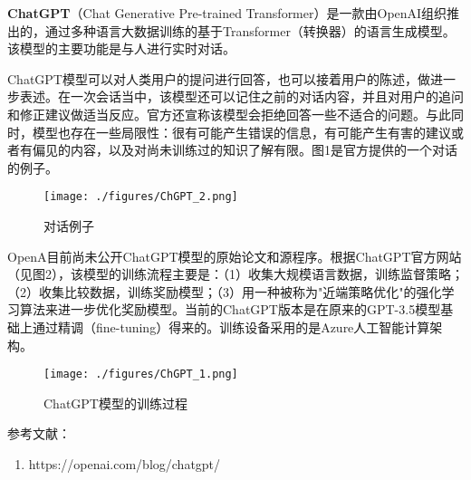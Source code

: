 
\textbf{ChatGPT}（Chat Generative Pre-trained Transformer）是一款由OpenAI组织推出的，通过多种语言大数据训练的基于Transformer（转换器）的语言生成模型。该模型的主要功能是与人进行实时对话。

ChatGPT模型可以对人类用户的提问进行回答，也可以接着用户的陈述，做进一步表述。在一次会话当中，该模型还可以记住之前的对话内容，并且对用户的追问和修正建议做适当反应。官方还宣称该模型会拒绝回答一些不适合的问题。与此同时，模型也存在一些局限性：很有可能产生错误的信息，有可能产生有害的建议或者有偏见的内容，以及对尚未训练过的知识了解有限。图1是官方提供的一个对话的例子。

\begin{figure}[ht]
\centering
\texttt{[image: ./figures/ChGPT\_2.png]}
\caption{对话例子} \label{ChGPT_fig2}
\end{figure}

OpenA目前尚未公开ChatGPT模型的原始论文和源程序。根据ChatGPT官方网站（见图2），该模型的训练流程主要是：（1）收集大规模语言数据，训练监督策略；（2）收集比较数据，训练奖励模型；（3）用一种被称为"近端策略优化"的强化学习算法来进一步优化奖励模型。当前的ChatGPT版本是在原来的GPT-3.5模型基础上通过精调（fine-tuning）得来的。训练设备采用的是Azure人工智能计算架构。
\begin{figure}[ht]
\centering
\texttt{[image: ./figures/ChGPT\_1.png]}
\caption{ChatGPT模型的训练过程} \label{ChGPT_fig1}
\end{figure}




参考文献：
\begin{enumerate}
\item https://openai.com/blog/chatgpt/
\end{enumerate}